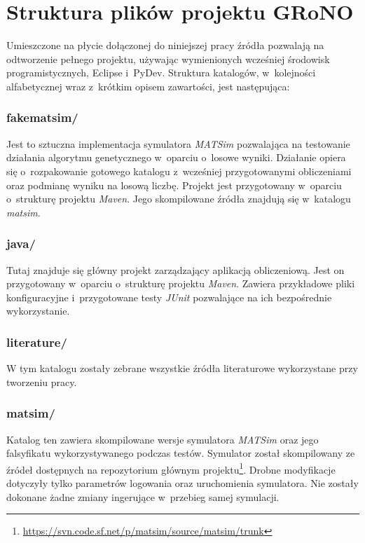 \documentclass[twoside,12pt]{report}
\begin{document}
\section{Struktura plików projektu GRoNO}
Umieszczone na płycie dołączonej do niniejszej pracy źródła pozwalają na odtworzenie pełnego projektu, używając wymienionych wcześniej środowisk programistycznych, Eclipse i~PyDev. Struktura katalogów, w~kolejności alfabetycznej wraz z~krótkim opisem zawartości, jest następująca:

\subsubsection{fakematsim/}
Jest to sztuczna implementacja symulatora \textit{MATSim} pozwalająca na testowanie działania algorytmu genetycznego w~oparciu o~losowe wyniki. Działanie opiera się o~rozpakowanie gotowego katalogu z~wcześniej przygotowanymi obliczeniami oraz podmianę wyniku na losową liczbę. Projekt jest przygotowany w~oparciu o~strukturę projektu \textit{Maven}. Jego skompilowane źródła znajdują się  w~katalogu \textit{matsim}.

\subsubsection{java/}
Tutaj znajduje się główny projekt zarządzający aplikacją obliczeniową. Jest on przygotowany w~oparciu o~strukturę projektu \textit{Maven}. Zawiera przykładowe pliki konfiguracyjne i~przygotowane testy \textit{JUnit} pozwalające na ich bezpośrednie wykorzystanie.

\subsubsection{literature/}
W tym katalogu zostały zebrane wszystkie źródła literaturowe wykorzystane przy tworzeniu pracy.

\subsubsection{matsim/}
Katalog ten zawiera skompilowane wersje symulatora \textit{MATSim} oraz jego falsyfikatu wykorzystywanego podczas testów. Symulator został skompilowany ze źródeł dostępnych na repozytorium głównym projektu\footnote {\url{https://svn.code.sf.net/p/matsim/source/matsim/trunk}}. Drobne modyfikacje dotyczyły tylko parametrów logowania oraz uruchomienia symulatora. Nie zostały dokonane żadne zmiany ingerujące w~przebieg samej symulacji.
\end{document}
